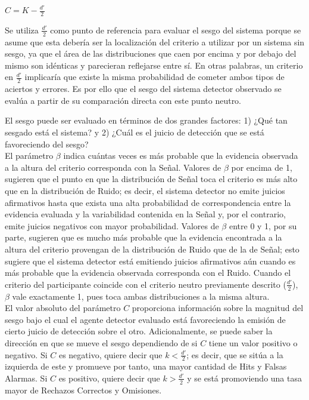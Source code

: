 \begin{itemize}
\begin{itemize}
\begin{center}
$C =  K - \frac{d'}{2}$ \\
\end{center}

Se utiliza $\frac{d'}{2}$ como punto de referencia para evaluar el sesgo del sistema porque se asume que esta debería ser la localización del criterio a utilizar por un sistema sin sesgo, ya que el área de las distribuciones que caen por encima y por debajo del mismo son idénticas y parecieran reflejarse entre sí. En otras palabras, un criterio en $\frac{d'}{2}$ implicaría que existe la misma probabilidad de cometer ambos tipos de aciertos y errores. Es por ello que el sesgo del sistema detector observado se evalúa a partir de su comparación directa con este punto neutro.\\

\end{itemize}

El sesgo puede ser evaluado en términos de dos grandes factores: 1) ¿Qué tan sesgado está el sistema? y 2) ¿Cuál es el juicio de detección que se está favoreciendo del sesgo?\\

El parámetro $\beta$ indica cuántas veces es más probable que la evidencia observada a la altura del criterio corresponda con la Señal. Valores de $\beta$ por encima de 1, sugieren que el punto en que la distribución de Señal toca el criterio es más alto que en la distribución de Ruido; es decir, el sistema detector no emite juicios afirmativos hasta que exista una alta probabilidad de correspondencia entre la evidencia evaluada y la variabilidad contenida en la Señal y, por el contrario, emite juicios negativos con mayor probabilidad. Valores de $\beta$ entre 0 y 1, por su parte, sugieren que es mucho más probable que la evidencia encontrada a la altura del criterio provengan de la distribución de Ruido que de la de Señal; esto sugiere que el sistema detector está emitiendo juicios afirmativos aún cuando es más probable que la evidencia observada corresponda con el Ruido. Cuando el criterio del participante coincide con el criterio neutro previamente descrito ($\frac{d'}{2}$), $\beta$ vale exactamente 1, pues toca ambas distribuciones a la misma altura.\\

El valor absoluto del parámetro $C$ proporciona información sobre la magnitud del sesgo bajo el cual el agente detector evaluado está favoreciendo la emisión de cierto juicio de detección sobre el otro. Adicionalmente, se puede saber la dirección en que se mueve el sesgo dependiendo de si $C$ tiene un valor positivo o negativo. Si $C$ es negativo, quiere decir que $k < \frac{d'}{2}$; es decir, que se sitúa a la izquierda de este y promueve por tanto, una mayor cantidad de Hits y Falsas Alarmas. Si $C$ es positivo, quiere decir que $k > \frac{d'}{2}$ y se está promoviendo una tasa mayor de Rechazos Correctos y Omisiones.\\


\end{itemize}
